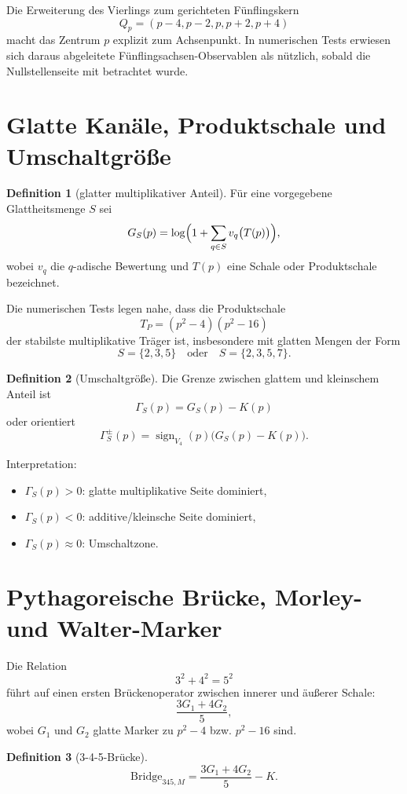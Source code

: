 \documentclass[11pt,a4paper]{article}
\theoremstyle{definition}
\newtheorem{definition}{Definition}
\begin{document}
Die Erweiterung des Vierlings zum gerichteten Fünflingskern
\[
Q_p=(p-4,p-2,p,p+2,p+4)
\]
macht das Zentrum $p$ explizit zum Achsenpunkt. In numerischen Tests erwiesen sich daraus abgeleitete Fünflingsachsen-Observablen als nützlich, sobald die Nullstellenseite mit betrachtet wurde.

\section{Glatte Kanäle, Produktschale und Umschaltgröße}

\begin{definition}[glatter multiplikativer Anteil]
Für eine vorgegebene Glattheitsmenge $S$ sei
\[
G_S(p)=\log\Bigl(1+\sum_{q\in S} v_q\bigl(T(p)\bigr)\Bigr),
\]
wobei $v_q$ die $q$-adische Bewertung und $T(p)$ eine Schale oder Produktschale bezeichnet.
\end{definition}

Die numerischen Tests legen nahe, dass die Produktschale
\[
T_P=(p^2-4)(p^2-16)
\]
der stabilste multiplikative Träger ist, insbesondere mit glatten Mengen der Form
\[
S=\{2,3,5\}\quad\text{oder}\quad S=\{2,3,5,7\}.
\]

\begin{definition}[Umschaltgröße]
Die Grenze zwischen glattem und kleinschem Anteil ist
\[
\Gamma_S(p)=G_S(p)-K(p)
\]
oder orientiert
\[
\Gamma_S^{\pm}(p)=\operatorname{sign}_{V_4}(p)\bigl(G_S(p)-K(p)\bigr).
\]
\end{definition}

Interpretation:
\begin{itemize}[leftmargin=1.5em]
\item $\Gamma_S(p)>0$: glatte multiplikative Seite dominiert,
\item $\Gamma_S(p)<0$: additive/kleinsche Seite dominiert,
\item $\Gamma_S(p)\approx 0$: Umschaltzone.
\end{itemize}

\section{Pythagoreische Brücke, Morley- und Walter-Marker}

Die Relation
\[
3^2+4^2=5^2
\]
führt auf einen ersten Brückenoperator zwischen innerer und äußerer Schale:
\[
\frac{3G_1+4G_2}{5},
\]
wobei $G_1$ und $G_2$ glatte Marker zu $p^2-4$ bzw. $p^2-16$ sind.

\begin{definition}[3-4-5-Brücke]
\[
\mathrm{Bridge}_{345,M}=\frac{3G_1+4G_2}{5}-K.
\]
\end{definition}
\end{document}
